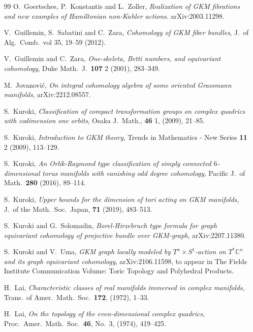 \documentclass[12pt]{amsart}
\theoremstyle{remark}
\numberwithin{equation}{section}
\begin{document}
\begin{thebibliography}{99}
O.~Goertsches, P.~Konstantis and L.~Zoller, 
\emph{Realization of GKM fibrations and new examples of Hamiltonian non-K{\rm$\ddot{a}$}hler actions}.
arXiv:2003.11298.

V.~Guillemin, S.~Sabatini and C.~Zara,
\emph{Cohomology of GKM fiber bundles},
J.~of Alg.~Comb.~vol 35, 19--59 (2012).

V.~Guillemin and C.~Zara, 
\emph{One-skeleta, Betti numbers, and equivariant cohomology}, 
Duke Math.~J.~\textbf{107} 2 (2001), 283--349.

M.~Jovanovi\'c,
\emph{On integral cohomology algebra of some oriented Grassmann manifolds},
arXiv:2212.08557.

S.~Kuroki,
\emph{Classification of compact transformation groups on complex quadrics with codimension one orbits}, 
Osaka J.~Math., \textbf{46} 1, (2009), 21--85.

S.~Kuroki, 
\emph{Introduction to GKM theory}, 
Trends in Mathematics - New Series \textbf{11} 2 (2009), 113--129.

S.~Kuroki, 
\emph{An Orlik-Raymond type classification of simply connected $6$-dimensional torus manifolds with vanishing odd degree cohomology}, 
Pacific J.~of Math.~\textbf{280} (2016), 89--114.

S.~Kuroki,
\emph{Upper bounds for the dimension of tori acting on GKM manifolds}, 
J.~of the Math.~Soc.~Japan, \textbf{71} (2019), 483--513.

S.~Kuroki and G.~Solomadin, 
\emph{Borel-Hirzebruch type formula for graph equivariant cohomology of projective bundle over GKM-graph}, arXiv:2207.11380.

S.~Kuroki and V.~Uma, 
\emph{GKM graph locally modeled by $T^{n}\times S^{1}$-action on $T^{*}\mathbb{C}^{n}$ and its graph equivariant cohomology}, arXiv:2106.11598, to appear in The Fields Institute Communication Volume: Toric Topology and Polyhedral Products.

H.~Lai,
\emph{Characteristic classes of real manifolds immersed in complex manifolds},
Trans.~of Amer.~Math.~Soc.~\textbf{172}, (1972), 1--33.

H.~Lai,
\emph{On the topology of the even-dimensional complex quadrics},
Proc.~Amer.~Math.~Soc.~\textbf{46}, No.~3, (1974), 419--425.


\end{thebibliography}
\end{document}
